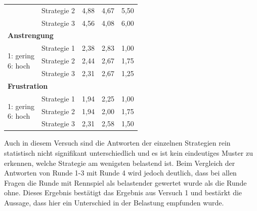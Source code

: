 \documentclass[12pt,a4paper]{scrartcl}
\begin{document}
\begin{longtable}{|p{4cm}|p{2cm}|p{2cm}|p{2cm}|p{2cm}|}
 & Strategie 2 & 4,88 & 4,67 & 5,50 \\
 & Strategie 3 & 4,56 & 4,08 & 6,00 \\
\hline
		\multicolumn{5}{l}{\textbf{Anstrengung}}\\
		\hline
\multirow{3}{4cm}{1: gering \newline 6: hoch} & Strategie 1 & 2,38 & 2,83 & 1,00 \\
 & Strategie 2 & 2,44 & 2,67 & 1,75 \\
 & Strategie 3 & 2,31 & 2,67 & 1,25\\
\hline
		\multicolumn{5}{l}{\textbf{Frustration}}\\
		\hline
\multirow{3}{4cm}{1: gering \newline 6: hoch} & Strategie 1 & 1,94 & 2,25 & 1,00 \\
 & Strategie 2 & 1,94 & 2,00 & 1,75 \\
 & Strategie 3 & 2,31 & 2,58 & 1,50 \\
\hline
\end{longtable}

Auch in diesem Versuch sind die Antworten der einzelnen Strategien rein statistisch nicht signifikant unterschiedlich und es ist kein eindeutiges Muster zu erkennen, welche Strategie am wenigsten belastend ist. 
Beim Vergleich der Antworten von Runde 1-3 mit Runde 4 wird jedoch deutlich, dass bei allen Fragen die Runde mit Rennspiel als belastender gewertet wurde als die Runde ohne. Dieses Ergebnis bestätigt das Ergebnis aus Versuch 1 und bestärkt die Aussage, dass hier ein Unterschied in der Belastung empfunden wurde.  
\end{document}
